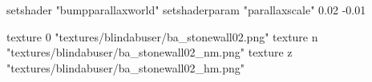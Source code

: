 	setshader "bumpparallaxworld"
	setshaderparam "parallaxscale" 0.02 -0.01

		texture 0 "textures/blindabuser/ba_stonewall02.png"
		texture n "textures/blindabuser/ba_stonewall02_nm.png"
		texture z "textures/blindabuser/ba_stonewall02_hm.png"
